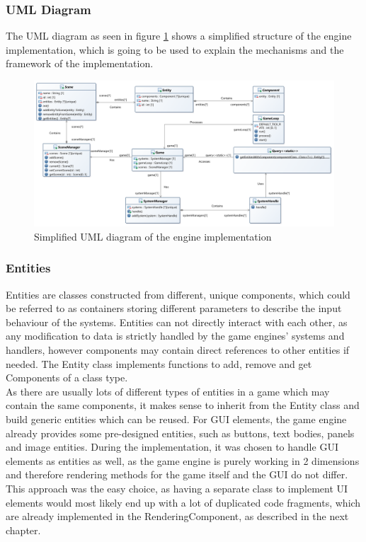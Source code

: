 \subsubsection{UML Diagram}\label{subsubsec:uml-diagram}
The \gls{UML} diagram as seen in figure \ref{fig:ecs-block-diagram} shows a simplified structure of the engine implementation, which is going to be used to explain the mechanisms
and the framework of the implementation.
\begin{figure}
    \centering
    \includegraphics[width=1.0\textwidth]{./Pictures/res/implementation/ecs-uml}
    \caption{Simplified UML diagram of the engine implementation}
    \label{fig:ecs-block-diagram}
\end{figure}

\subsubsection{Entities}\label{subsubsec:entities}
Entities are classes constructed from different, unique components, which could be referred to as containers storing different parameters to
describe the input behaviour of the systems.
Entities can not directly interact with each other, as any modification to data is strictly handled by the game engines' systems and handlers,
however components may contain direct references to other entities if needed.
The Entity class implements functions to add, remove and get Components of a class type.
\\
As there are usually lots of different types of entities in a game which may contain the same components, it makes sense to inherit from the Entity class and
build generic entities which can be reused.
For \gls{GUI} elements, the game engine already provides some pre-designed entities, such as buttons, text bodies, panels and image entities.
During the implementation, it was chosen to handle GUI elements as entities as well, as the game engine is purely working in 2 dimensions and therefore
rendering methods for the game itself and the GUI do not differ.
This approach was the easy choice, as having a separate class to implement UI elements would most likely end up with a lot of duplicated
code fragments, which are already implemented in the RenderingComponent, as described in the next chapter.
